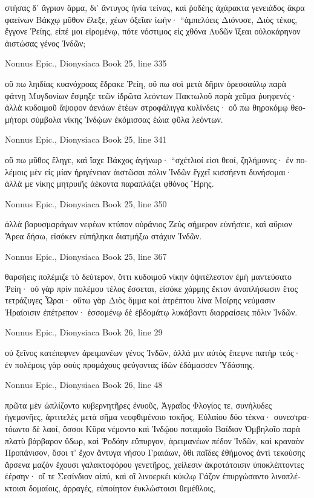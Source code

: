 \documentclass[12pt,letterpaper,twoside,final]{memoir}
\begin{document}
\begin{greek}
στήσας δ' ἄγριον ἅρμα, δι' ἄντυγος ἡνία τείνας, 
καὶ ῥοδέης ἀχάρακτα γενειάδος ἄκρα φαείνων 
Βάκχῳ μῦθον ἔλεξε, χέων ὀξεῖαν ἰωήν· 
 “ἀμπελόεις Διόνυσε, Διὸς τέκος, ἔγγονε Ῥείης, 
εἰπέ μοι εἰρομένῳ, πότε νόστιμος εἰς χθόνα Λυδῶν 
ἵξεαι οὐλοκάρηνον ἀιστώσας γένος Ἰνδῶν; 



Nonnus Epic., Dionysiaca 
Book 25, line 335

οὔ πω ληιδίας κυανόχροας ἔδρακε Ῥείη, 
οὔ πω σοὶ μετὰ δῆριν ὀρεσσαύλῳ παρὰ φάτνῃ   
Μυγδονίων ἔσμηξε τεῶν ἱδρῶτα λεόντων 
Πακτωλοῦ παρὰ χεῦμα ῥυηφενές· ἀλλὰ κυδοιμοῦ 
ἄψοφον ἀενάων ἐτέων στροφάλιγγα κυλίνδεις· 
οὔ πω θηροκόμῳ θεομήτορι σύμβολα νίκης 
Ἰνδῴων ἐκόμισσας ἑώια φῦλα λεόντων. 



Nonnus Epic., Dionysiaca 
Book 25, line 341

οὔ πω μῦθος ἔληγε, καὶ ἴαχε Βάκχος ἀγήνωρ· 
 “σχέτλιοί εἰσι θεοί, ζηλήμονες· ἐν πολέμοις μὲν 
εἰς μίαν ἠριγένειαν ἀιστῶσαι πόλιν Ἰνδῶν 
ἔγχεϊ κισσήεντι δυνήσομαι· ἀλλά με νίκης 
μητρυιῆς ἀέκοντα παραπλάζει φθόνος Ἥρης. 



Nonnus Epic., Dionysiaca 
Book 25, line 350

ἀλλὰ βαρυσμαράγων νεφέων κτύπον οὐράνιος Ζεὺς 
σήμερον εὐνήσειε, καὶ αὔριον Ἄρεα δήσω, 
εἰσόκεν εὐπήληκα διατμήξω στάχυν Ἰνδῶν. 



Nonnus Epic., Dionysiaca 
Book 25, line 367

θαρσήεις πολέμιζε τὸ δεύτερον, ὅττι κυδοιμοῦ 
νίκην ὀψιτέλεστον ἐμὴ μαντεύσατο Ῥείη· 
οὐ γὰρ πρὶν πολέμου τέλος ἔσσεται, εἰσόκε χάρμης 
ἕκτον ἀναπλήσωσιν ἔτος τετράζυγες Ὧραι· 
οὕτω γὰρ Διὸς ὄμμα καὶ ἀτρέπτου λίνα Μοίρης 
νεύμασιν Ἡραίοισιν ἐπέτρεπον· ἐσσομένῳ δὲ 
ἑβδομάτῳ λυκάβαντι διαρραίσεις πόλιν Ἰνδῶν. 



Nonnus Epic., Dionysiaca 
Book 26, line 29

οὐ ξεῖνος κατέπεφνεν ἀρειμανέων γένος Ἰνδῶν, 
ἀλλά μιν αὐτὸς ἔπεφνε πατὴρ τεός· ἐν πολέμοις γὰρ 
σοὺς προμάχους φεύγοντας ἰδὼν ἐδάμασσεν Ὑδάσπης. 



Nonnus Epic., Dionysiaca 
Book 26, line 48

πρῶτα μὲν ὡπλίζοντο κυβερνητῆρες ἐνυοῦς, 
Ἀγραῖος Φλογίος τε, συνήλυδες ἡγεμονῆες, 
ἀρτιτελὲς μετὰ σῆμα νεοφθιμένοιο τοκῆος, 
Εὐλαίου δύο τέκνα· συνεστρατόωντο δὲ λαοί, 
ὅσσοι Κῦρα νέμοντο καὶ Ἰνδῴου ποταμοῖο 
Βαίδιον Ὀμβηλοῖο παρὰ πλατὺ βάρβαρον ὕδωρ, 
καὶ Ῥοδόην εὔπυργον, ἀρειμανέων πέδον Ἰνδῶν, 
καὶ κραναὸν Προπάνισον, ὅσοι τ' ἔχον ἄντυγα νήσου 
Γραιάων, ὅθι παῖδες ἐθήμονος ἀντὶ τεκούσης 
ἄρσενα μαζὸν ἔχουσι γαλακτοφόρου γενετῆρος, 
χείλεσιν ἀκροτάτοισιν ὑποκλέπτοντες ἐέρσην· 
οἵ τε Σεσίνδιον αἰπύ, καὶ οἳ λινοερκέι κύκλῳ 
Γάζον ἐπυργώσαντο λινοπλέκτοισι δομαίοις, 
ἀρραγές, εὐποίητον ἐυκλώστοισι θεμέθλοις,   





\end{greek}
\end{document}
